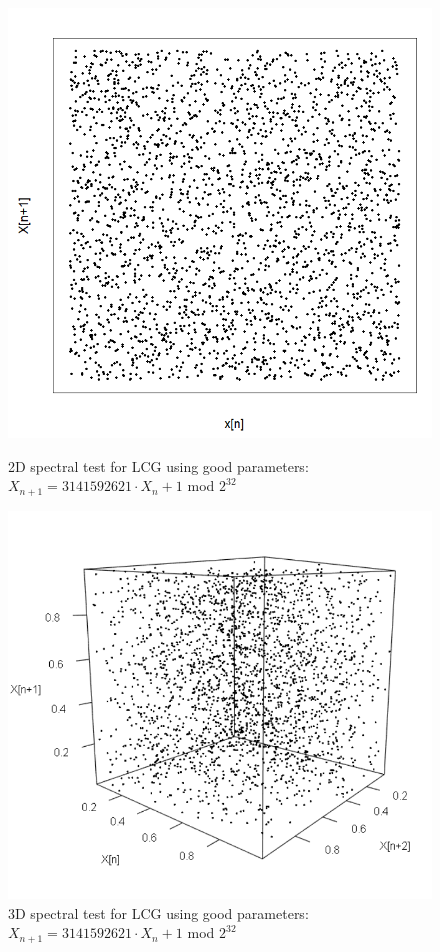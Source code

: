 \begin{figure}
	\centering
	\begin{minipage}{0.45\textwidth}
		\centering
		\includegraphics[width=\linewidth]{billder/spec_good_lcg_2d.png}
		\caption{2D spectral test for LCG using good parameters: $X_{n+1}=3 141 592 621\cdot X_{n}+1$ mod $2^{32}$}
		\label{fig:goodspec2d}
	\end{minipage}\hfill
	\begin{minipage}{0.45\textwidth}
		\centering
		\includegraphics[width=\linewidth]{billder/spec_good_lcg_3d.png}
		\caption{3D spectral test for LCG using good parameters: $X_{n+1}=3 141 592 621\cdot X_{n}+1$ mod $2^{32}$}
		\label{fig:goodspec3d}
	\end{minipage}
\end{figure}


